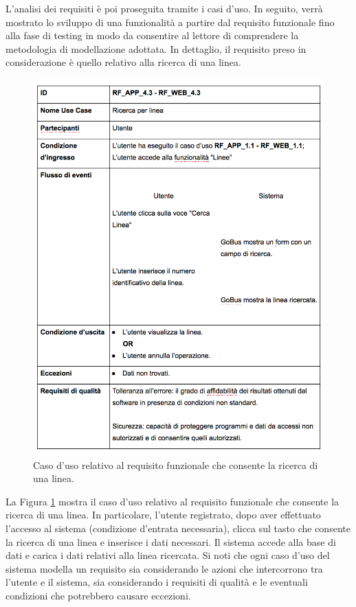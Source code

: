 L'analisi dei requisiti \`{e} poi proseguita tramite i casi d\rq uso. In seguito, verr\`{a} mostrato lo sviluppo di una funzionalit\`{a} a partire dal requisito funzionale fino alla fase di testing in modo da consentire al lettore di comprendere la metodologia di modellazione adottata. In dettaglio, il requisito preso in considerazione \`{e} quello relativo alla ricerca di una linea.

\begin{figure}[tb]
\centering
\includegraphics[scale=.7]{img/cd.png}
\caption{Caso d\rq uso relativo al requisito funzionale che consente la ricerca di una linea.}
\label{fig:cd}
\end{figure}

La Figura \ref{fig:cd} mostra il caso d\rq uso relativo al requisito funzionale che consente la ricerca di una linea. In particolare, l'utente registrato, dopo aver effettuato l'accesso al sistema (condizione d\rq entrata necessaria), clicca sul tasto che consente la ricerca di una linea e inserisce i dati necessari. Il sistema accede alla base di dati e carica i dati relativi alla linea ricercata. Si noti che ogni caso d\rq uso del sistema modella un requisito sia considerando le azioni che intercorrono tra l\rq utente e il sistema, sia considerando i requisiti di qualit\`{a} e le eventuali condizioni che potrebbero causare eccezioni.\\

